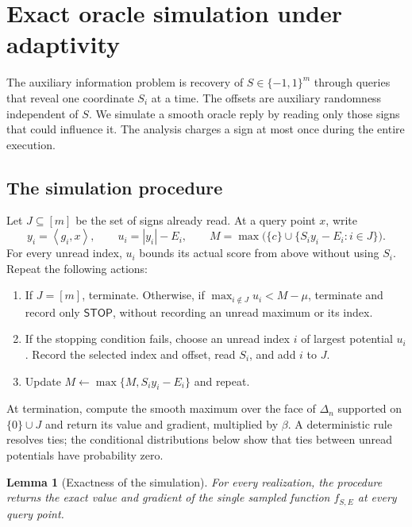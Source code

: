 \documentclass[11pt,a4paper]{article}
\newtheorem{lemma}[theorem]{Lemma}
\theoremstyle{definition}
\theoremstyle{remark}
\newcommand{\ip}[2]{\left\langle #1,#2\right\rangle}
\begin{document}
\section{Exact oracle simulation under adaptivity}\label{sec:simulation}

The auxiliary information problem is recovery of
$S\in\{-1,1\}^m$ through queries that reveal one coordinate $S_i$ at a time.
The offsets are auxiliary randomness independent of $S$.
We simulate a smooth oracle reply by reading only those signs that could
influence it. The analysis charges a sign at most once during the entire
execution.

\subsection{The simulation procedure}

Let $J\subseteq[m]$ be the set of signs already read. At a query point $x$,
write
\begin{equation}\label{eq:potentials}
 y_i=\ip{g_i}{x},\qquad
 u_i=|y_i|-E_i,\qquad
 M=\max\bigl(\{c\}\cup\{S_i y_i-E_i:i\in J\}\bigr).
\end{equation}
For every unread index, $u_i$ bounds its actual score from above without using
$S_i$. Repeat the following actions:
\begin{enumerate}
\item If $J=[m]$, terminate. Otherwise, if
      $\max_{i\notin J}u_i<M-\mu$, terminate and record only
      $\mathsf{STOP}$, without recording an unread maximum or its index.
\item If the stopping condition fails, choose an unread index $i$ of largest
      potential $u_i$. Record the selected index and offset, read $S_i$, and
      add $i$ to $J$.
\item Update $M\leftarrow\max\{M,S_i y_i-E_i\}$ and repeat.
\end{enumerate}
At termination, compute the smooth maximum over the face of $\Delta_n$
supported on $\{0\}\cup J$ and return its value and gradient, multiplied by
$\beta$. A deterministic rule resolves ties; the conditional distributions
below show that ties between unread potentials have probability zero.

\begin{lemma}[Exactness of the simulation]\label{lem:exact}
For every realization, the procedure returns the exact value and gradient of
the single sampled function $f_{S,E}$ at every query point.
\end{lemma}
\end{document}
